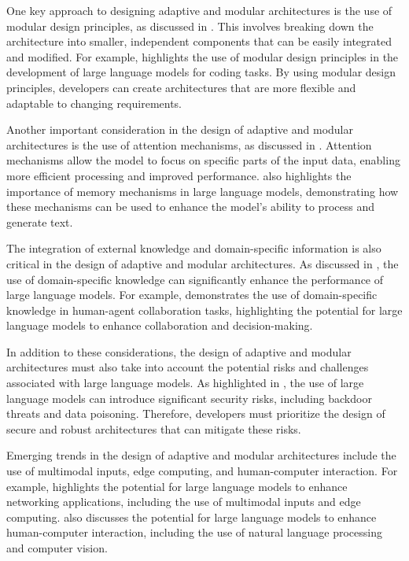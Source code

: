 \documentclass[11pt,a4paper]{article}
\begin{document}
One key approach to designing adaptive and modular architectures is the use of modular design principles, as discussed in \cite{arxiv:2308.04026}. This involves breaking down the architecture into smaller, independent components that can be easily integrated and modified. For example, \cite{doi:10.18653/v1/2023.acl-long.411} highlights the use of modular design principles in the development of large language models for coding tasks. By using modular design principles, developers can create architectures that are more flexible and adaptable to changing requirements.

Another important consideration in the design of adaptive and modular architectures is the use of attention mechanisms, as discussed in \cite{doi:10.18653/v1/2023.findings-emnlp.128}. Attention mechanisms allow the model to focus on specific parts of the input data, enabling more efficient processing and improved performance. \cite{arxiv:2301.04589} also highlights the importance of memory mechanisms in large language models, demonstrating how these mechanisms can be used to enhance the model's ability to process and generate text.

The integration of external knowledge and domain-specific information is also critical in the design of adaptive and modular architectures. As discussed in \cite{arxiv:2502.10708}, the use of domain-specific knowledge can significantly enhance the performance of large language models. For example, \cite{arxiv:2402.12914} demonstrates the use of domain-specific knowledge in human-agent collaboration tasks, highlighting the potential for large language models to enhance collaboration and decision-making.

In addition to these considerations, the design of adaptive and modular architectures must also take into account the potential risks and challenges associated with large language models. As highlighted in \cite{arxiv:2402.11208}, the use of large language models can introduce significant security risks, including backdoor threats and data poisoning. Therefore, developers must prioritize the design of secure and robust architectures that can mitigate these risks.

Emerging trends in the design of adaptive and modular architectures include the use of multimodal inputs, edge computing, and human-computer interaction. For example, \cite{doi:10.1109/mnet.2024.3435752} highlights the potential for large language models to enhance networking applications, including the use of multimodal inputs and edge computing. \cite{arxiv:2309.14365} also discusses the potential for large language models to enhance human-computer interaction, including the use of natural language processing and computer vision.
\end{document}
